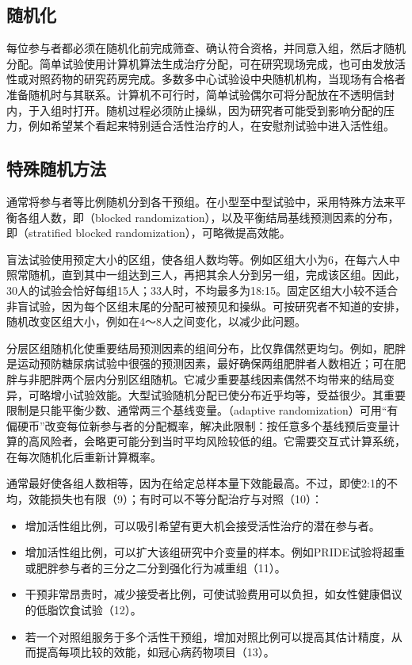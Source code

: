 \subsection{随机化}
每位参与者都必须在随机化前完成筛查、确认符合资格，并同意入组，然后才随机分配。简单试验使用计算机算法生成治疗分配，可在研究现场完成，也可由发放活性或对照药物的研究药房完成。多数多中心试验设中央随机机构，当现场有合格者准备随机时与其联系。计算机不可行时，简单试验偶尔可将分配放在不透明信封内，于入组时打开。随机过程必须防止操纵，因为研究者可能受到影响分配的压力，例如希望某个看起来特别适合活性治疗的人，在安慰剂试验中进入活性组。

\subsection{特殊随机方法}
通常将参与者等比例随机分到各干预组。在小型至中型试验中，采用特殊方法来平衡各组人数，即（blocked randomization），以及平衡结局基线预测因素的分布，即（stratified blocked randomization），可略微提高效能。

盲法试验使用预定大小的区组，使各组人数均等。例如区组大小为6，在每六人中照常随机，直到其中一组达到三人，再把其余人分到另一组，完成该区组。因此，30人的试验会恰好每组15人；33人时，不均最多为18:15。固定区组大小较不适合非盲试验，因为每个区组末尾的分配可被预见和操纵。可按研究者不知道的安排，随机改变区组大小，例如在4～8人之间变化，以减少此问题。

分层区组随机化使重要结局预测因素的组间分布，比仅靠偶然更均匀。例如，肥胖是运动预防糖尿病试验中很强的预测因素，最好确保两组肥胖者人数相近；可在肥胖与非肥胖两个层内分别区组随机。它减少重要基线因素偶然不均带来的结局变异，可略增小试验效能。大型试验随机分配已使分布近乎均等，受益很少。其重要限制是只能平衡少数、通常两三个基线变量。（adaptive randomization）可用“有偏硬币”改变每位新参与者的分配概率，解决此限制：按任意多个基线预后变量计算的高风险者，会略更可能分到当时平均风险较低的组。它需要交互式计算系统，在每次随机化后重新计算概率。

通常最好使各组人数相等，因为在给定总样本量下效能最高。不过，即使2:1的不均，效能损失也有限（9）；有时可以不等分配治疗与对照（10）：
\begin{itemize}
\item 增加活性组比例，可以吸引希望有更大机会接受活性治疗的潜在参与者。
\item 增加活性组比例，可以扩大该组研究中介变量的样本。例如PRIDE试验将超重或肥胖参与者的三分之二分到强化行为减重组（11）。
\item 干预非常昂贵时，减少接受者比例，可使试验费用可以负担，如女性健康倡议的低脂饮食试验（12）。
\item 若一个对照组服务于多个活性干预组，增加对照比例可以提高其估计精度，从而提高每项比较的效能，如冠心病药物项目（13）。
\end{itemize}

